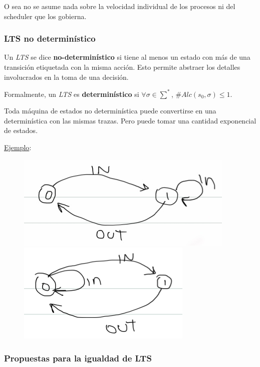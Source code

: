 \documentclass[]{article}
\begin{document}
O sea no se asume nada sobre la velocidad individual de los procesos ni del scheduler que los gobierna.

\subsubsection{LTS no determinístico}
Un \textit{LTS} se dice \textbf{no-determinístico} si tiene al menos un estado con más de una transición etiquetada con la misma acción. Esto permite abstraer los detalles involucrados en la toma de una decisión.

Formalmente, un \textit{LTS} es \textbf{determinístico} si $\forall \sigma \in \sum^*$, $\#Alc(s_0,\sigma)\leq 1$.

Toda máquina de estados no determinística puede convertirse en una determinística con las mismas trazas. Pero puede tomar una cantidad exponencial de estados.
~\newline

\underline{Ejemplo}:
\begin{figure}[htb]
 \begin{center}
   \leavevmode
   \includegraphics[scale=0.40]{Deter.jpg}
   \includegraphics[scale=0.40]{NoDeter.png}
 \end{center}
\end{figure}


\subsubsection{Propuestas para la igualdad de LTS}
\end{document}
